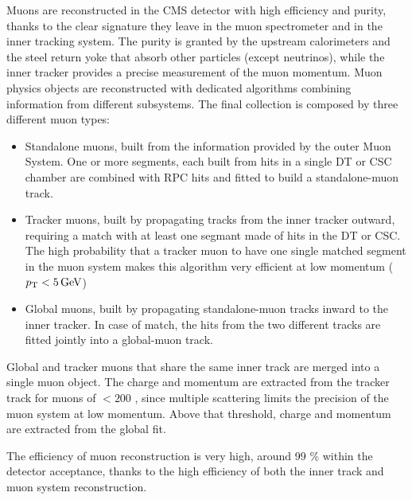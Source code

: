 Muons are reconstructed in the CMS detector with high efficiency and purity,
thanks to the clear signature they leave in the muon spectrometer and in the inner tracking system.
The purity is granted by the upstream calorimeters and the steel return yoke that absorb other particles (except neutrinos),
while the inner tracker provides a precise measurement of the muon momentum.
Muon physics objects are reconstructed with dedicated algorithms combining information from different subsystems.
The final collection is composed by three different muon types:

\begin{itemize}
\item Standalone muons, built from the information provided by the outer Muon System.
      One or more segments, each built from hits in a single DT or CSC chamber are combined
      with RPC hits and fitted to build a standalone-muon track.
\item Tracker muons, built by propagating tracks from the inner tracker outward,
      requiring a match with at least one segmant made of hits in the DT or CSC.
      The high probability that a tracker muon to have one single matched segment in the muon system
      makes this algorithm very efficient at low momentum ($p_{\mathrm{T}} < 5 \,\text{Ge\hspace{-.08em}V}$)
\item Global muons, built by propagating standalone-muon tracks inward to the inner tracker.
      In case of match, the hits from the two different tracks are fitted jointly into a global-muon track.
\end{itemize}

Global and tracker muons that share the same inner track are merged into a single muon object.
The charge and momentum are extracted from the tracker track for muons of \PT $< 200$ \GeV,
since multiple scattering limits the precision of the muon system at low momentum.
Above that threshold, charge and momentum are extracted from the global fit.

The efficiency of muon reconstruction is very high, around 99 \% within the detector acceptance,
thanks to the high efficiency of both the inner track and muon system reconstruction.
